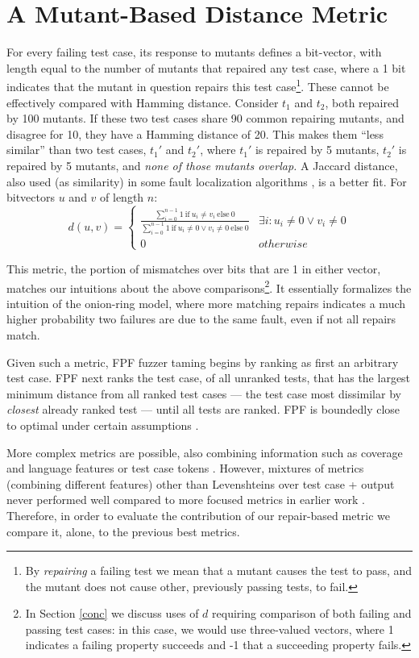 \section{A Mutant-Based Distance Metric}

For every failing test case, its response to mutants defines a bit-vector, with
length equal to the number of mutants that repaired any test case,
where a 1 bit indicates that the mutant in question repairs this test
case\footnote{By \emph{repairing} a failing test we mean that a mutant
causes the test to pass, and the mutant does not cause
other, previously passing tests, to fail.}.  These cannot be effectively compared with Hamming distance. Consider $t_1$ and $t_2$, both repaired
by 100 mutants.  If these two test cases share 90 common repairing
mutants, and disagree for 10, they have a Hamming
distance of 20.  This makes them ``less similar'' than two test cases,
$t_1'$ and $t_2'$, where $t_1'$ is repaired by 5 mutants, $t_2'$ is
repaired by 5 mutants, and \emph{none of those mutants overlap.}   A Jaccard distance, also used (as similarity) in some fault
localization algorithms \cite{Pinpoint}, is a better fit.  For bitvectors $u$ and $v$ of length $n$:
\[d(u,v) = 
\begin{cases}
\frac{\sum_{i=0}^{n-1} 1\ \text{if}\ u_i \neq v_i\ \text{else}\ 0}{\sum_{i=0}^{n-1} 1
\  \text{if}\ u_i \neq 0 \vee v_i \neq 0\ \text{else}\ 0} & \exists i:u_i\neq 0 \vee v_i\neq 0\\
0 & otherwise
\end{cases}
\]

This metric, the portion of mismatches over bits that are 1 in either
vector, matches our intuitions about the above comparisons\footnote{In Section \ref{conc} we discuss uses of $d$
requiring comparison of both failing and passing test cases:  in this 
case, we would use three-valued vectors, where 1 indicates a 
failing property succeeds and -1 that a succeeding property 
fails.}.  It
essentially formalizes the intuition of the onion-ring model, where
more matching repairs indicates a much higher probability two failures
are due to the same fault, even if not all repairs match.

Given such a metric, FPF \cite{Gonzalez} fuzzer taming \cite{PLDI13}
begins by ranking as first an arbitrary test case.   FPF next ranks the test
case, of all unranked tests, that has the largest minimum distance
from all ranked test cases --- the test case most dissimilar by \emph{closest}
already ranked test --- until all tests are ranked.  FPF is boundedly close
to optimal under certain assumptions \cite{Gonzalez}.

More complex metrics are possible, also combining information such as
coverage and language features or test case tokens \cite{PLDI13}.
However, mixtures of metrics (combining different features) other than
Levenshteins \cite{lev} over test case + output never performed well
compared to more focused metrics in earlier work \cite{PLDI13}.
Therefore, in order to evaluate the contribution of our repair-based
metric we compare it, alone, to the previous best metrics.

